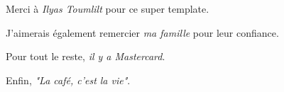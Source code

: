 %


Merci à \emph{Ilyas Toumlilt}\cite{toumlilt2021colony} pour ce super template.

J'aimerais également remercier \emph{ma famille} pour leur confiance.

Pour tout le reste, \textit{il y a Mastercard}.

Enfin, \textit{"La café, c'est la vie"}.
